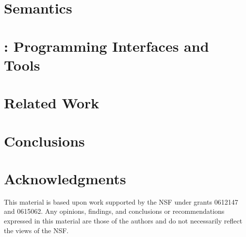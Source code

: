 \documentclass[nocopyrightspace]{sigplanconf}
\begin{document}
\section{\padsd{} Semantics}
\label{sec:semantics}


\section{\padsd{}:  Programming Interfaces and Tools}
\label{sec:programming}

\section{Related Work}
\label{sec:related}


\section{Conclusions}
\label{sec:conclusions}

\section*{Acknowledgments}

This material is based upon work 
supported by the NSF
   under grants 0612147 and 0615062.
Any opinions, findings, and conclusions or recommendations
   expressed in this material are those of the authors and do not
   necessarily reflect the views of the NSF.



\end{document}
